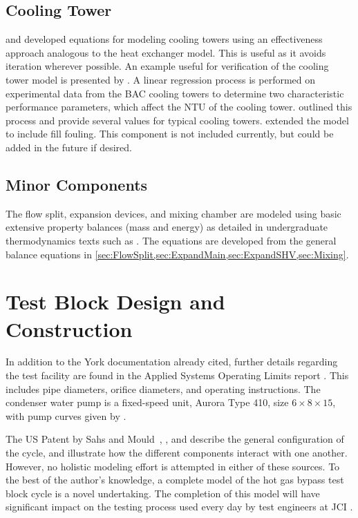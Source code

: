 \subsection{Cooling Tower}
\citet{braun1989} and \citet{mitchell2013} developed equations for modeling cooling towers 
using an effectiveness approach analogous to the heat exchanger model.
This is useful as it avoids iteration wherever possible. 
An example useful for verification of the cooling tower model 
is presented by \citet{mitchell2013}. 
A linear regression process is performed on experimental data from 
the BAC cooling towers \citep{CLTselect} to determine two characteristic performance parameters, 
which affect the NTU of the cooling tower. 
\citet{braun1989} outlined this process and provide several values 
for typical cooling towers. 
\citet{qureshi2006} extended the model to include fill fouling.
This component is not included currently, but could be added 
in the future if desired.

\subsection{Minor Components}
The flow split, expansion devices, and mixing chamber are modeled using 
basic extensive property balances (mass and energy) as detailed in 
undergraduate thermodynamics texts such as \citet{cengel2011}. 
The equations are developed from the general balance equations 
in \cref{sec:FlowSplit,sec:ExpandMain,sec:ExpandSHV,sec:Mixing}.

\section{Test Block Design and Construction}
In addition to the York documentation already cited, further details
regarding the test facility are found in the Applied Systems Operating Limits
report \citep{bluebook}. This includes pipe diameters, orifice diameters, and
operating instructions. The condenser water pump is a fixed-speed unit,
Aurora Type 410, size $6\times8\times15$, with pump curves given by
\citet{aurora2007}.

The US Patent by Sahs and Mould~\citep{sahs1956}, \citet{dirlea1996},
and \citet{mcgovern1984} describe the general configuration
of the cycle, and illustrate how the different components interact with one 
another.
However, no holistic modeling effort is attempted in either of these sources.
To the best of the author's knowledge, a complete model of the hot gas bypass
test block cycle is a novel undertaking.
The completion of this model will have significant impact on the testing process
used every day by test engineers at JCI \citep{sommer2013}.

